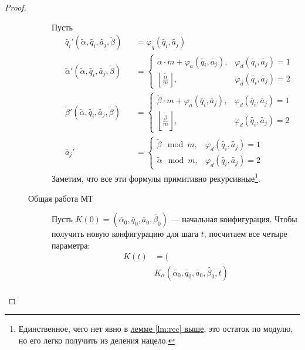 \begin{proof}
\begin{description}
\begin{description}
			Пусть 
			\[
			\begin{aligned}
				&\widetilde{ q_i}'  (\widetilde{ \alpha } , \widetilde{ q_i}, \widetilde{ a_j} , \widetilde{ \beta } ) &&= \varphi_{q}(\widetilde{ q_i} , \widetilde{ a_j} ) \\
				&\widetilde{ \alpha } ' (\widetilde{ \alpha } , \widetilde{ q_i} , \widetilde{ a_j} , \widetilde{ \beta } ) &&= 
				\begin{cases}
					\widetilde{ \alpha } \cdot m + \varphi_{a}(\widetilde{ q_i} , \widetilde {a_j}), & \varphi _{d}(\widetilde{ q_i} ,\widetilde{ a_j} ) = 1 \\
					\left\lfloor \frac{\widetilde{ \alpha } }{m} \right\rfloor, & \varphi _{d}(\widetilde {q_i},\widetilde {a_j}) = 2
				\end{cases}
					\\
				&\widetilde{ \beta } ' (\widetilde{ \alpha } , \widetilde {q_i}, \widetilde {a_j}, \widetilde{ \beta } ) &&= 
				\begin{cases}
					\widetilde{ \beta } \cdot m + \varphi_{a}(\widetilde {q_i}, \widetilde {a_j}), & \varphi _{d}(\widetilde {q_i} ,\widetilde {a_j} ) = 1 \\
					\left\lfloor \frac{\widetilde{ \beta } }{m} \right\rfloor, & \varphi _{d}(\widetilde {q_i},\widetilde {a_j} ) = 2
				\end{cases}
		\\
				& \widetilde {a_j} ' &&= 
		\begin{cases}
			\widetilde{ \beta }  \mod m, & \varphi _{d}(\widetilde {q_i} ,\widetilde {a_j} ) = 1 \\
			\widetilde{ \alpha  }  \mod m, & \varphi _{d}(\widetilde{ q_i} ,\widetilde {a_j} ) = 2 
		\end{cases}
			\end{aligned}
	\]
	Заметим, что все эти формулы примитивно рекурсивные\footnote{Единственное, чего нет явно в \hyperref[lm:rec]{лемме \ref{lm:rec} выше}, это остаток по модулю, но его легко получить из деления нацело.}.
\item[Общая работа МТ]
	Пусть $ K(0) = \left( \widetilde{ \alpha _0} , \widetilde{ q_0}, \widetilde{ a_0} , \widetilde{ \beta _0} \right) $ --- начальная конфигурация.
	Чтобы получить новую конфигурацию для шага $ t$, посчитаем все четыре параметра:
	\[
	\begin{aligned}
		K(t) &= ( \\
			 &K_{ \alpha }(\widetilde{ \alpha_0} , \widetilde{ q_0} , \widetilde{ a_0}, \widetilde{ \beta_0}, t) \\ 

\end{aligned}\]
\end{description}
\end{description}
\end{proof}
